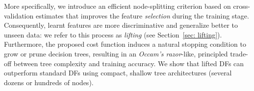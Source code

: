 More specifically, we introduce an efficient node-splitting criterion based on 
cross-validation estimates that improves the feature \textit{selection} during the training stage. Consequently, 
learnt features are more discriminative and generalize better to unseen data: we refer to this process as 
\textit{lifting} (see Section~\ref{sec: lifting}). Furthermore, the proposed cost function induces a natural stopping condition to grow or prune decision trees, %
resulting in an \textit{Occam's razor}-like, principled trade-off between tree complexity and training accuracy. %
We show that lifted DFs can outperform standard DFs using compact, shallow tree architectures 
(several dozens or hundreds of nodes). 

